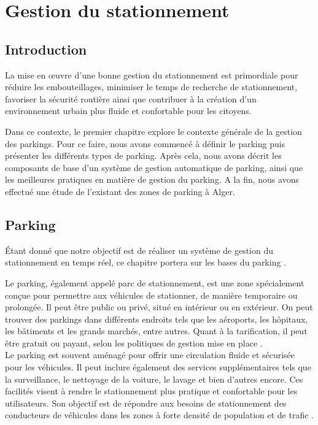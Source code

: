 \chapter{Gestion du stationnement}
\section{Introduction}

La mise en œuvre d'une bonne gestion du stationnement est primordiale pour réduire les embouteillages, minimiser le temps de recherche de stationnement, favoriser la sécurité routière ainsi que contribuer à la création d’un environnement urbain plus fluide et confortable pour les citoyens.

Dans ce contexte, le premier chapitre explore le contexte générale de la gestion des parkings. Pour ce faire, nous avons commencé à définir le parking puis présenter les différents types de parking. Après cela, nous avons décrit les composants de base d’un système de gestion automatique de parking, ainsi que les meilleures pratiques en matière de gestion du parking. A la fin, nous avons effectué une étude de l’existant des zones de parking à Alger.


\section{Parking}
Étant donné que notre objectif est de réaliser un système de gestion du stationnement en temps réel, ce chapitre portera sur les bases du parking .

Le parking, également appelé parc de stationnement, est une zone spécialement conçue pour permettre aux véhicules de stationner, de manière temporaire ou prolongée. Il peut être public ou privé, situé en intérieur ou en extérieur. On peut trouver des parkings dans différents endroits tels que les aéroports, les hôpitaux, les bâtiments et les grands marchés, entre autres. Quant à la tarification, il peut être gratuit ou payant, selon les politiques de gestion mise en place \cite{parking}.\\
Le parking est souvent aménagé pour offrir une circulation fluide et sécurisée pour les véhicules. Il peut inclure également des services supplémentaires tels que la surveillance, le nettoyage de la voiture, le lavage et bien d'autres encore. Ces facilités visent à rendre le stationnement plus pratique et confortable pour les utilisateurs.
Son objectif est de répondre aux besoins de stationnement des conducteurs de véhicules dans les zones à forte densité de population et de trafic \cite{blog-direct-signaletique}.

